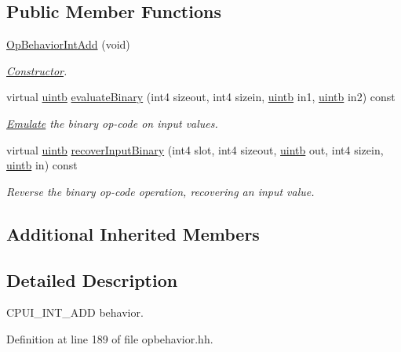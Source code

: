 \subsection*{Public Member Functions}
\begin{DoxyCompactItemize}
\item 
\mbox{\hyperlink{class_op_behavior_int_add_a169b6b899d6651d77ffd9a6e39aa077b}{Op\+Behavior\+Int\+Add}} (void)
\begin{DoxyCompactList}\small\item\em \mbox{\hyperlink{class_constructor}{Constructor}}. \end{DoxyCompactList}\item 
virtual \mbox{\hyperlink{types_8h_a2db313c5d32a12b01d26ac9b3bca178f}{uintb}} \mbox{\hyperlink{class_op_behavior_int_add_a389677fec86e520d3d30635a66170c83}{evaluate\+Binary}} (int4 sizeout, int4 sizein, \mbox{\hyperlink{types_8h_a2db313c5d32a12b01d26ac9b3bca178f}{uintb}} in1, \mbox{\hyperlink{types_8h_a2db313c5d32a12b01d26ac9b3bca178f}{uintb}} in2) const
\begin{DoxyCompactList}\small\item\em \mbox{\hyperlink{class_emulate}{Emulate}} the binary op-\/code on input values. \end{DoxyCompactList}\item 
virtual \mbox{\hyperlink{types_8h_a2db313c5d32a12b01d26ac9b3bca178f}{uintb}} \mbox{\hyperlink{class_op_behavior_int_add_acc0fa0fbf78a06922183b127b1be4b1e}{recover\+Input\+Binary}} (int4 slot, int4 sizeout, \mbox{\hyperlink{types_8h_a2db313c5d32a12b01d26ac9b3bca178f}{uintb}} out, int4 sizein, \mbox{\hyperlink{types_8h_a2db313c5d32a12b01d26ac9b3bca178f}{uintb}} in) const
\begin{DoxyCompactList}\small\item\em Reverse the binary op-\/code operation, recovering an input value. \end{DoxyCompactList}\end{DoxyCompactItemize}
\subsection*{Additional Inherited Members}


\subsection{Detailed Description}
C\+P\+U\+I\+\_\+\+I\+N\+T\+\_\+\+A\+DD behavior. 

Definition at line 189 of file opbehavior.\+hh.




